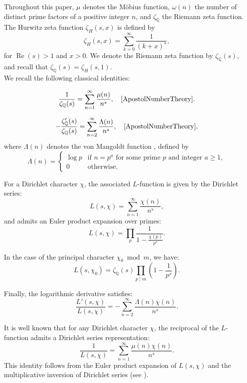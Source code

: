 \documentclass[12pt]{amsart}
\begin{document}
 
 
Throughout this paper, $\mu$ denotes the M\"obius function, $\omega(n)$ the number of distinct prime factors of a positive integer $n$, and $\zeta_\mathbb{Q}$ the Riemann zeta function.  The Hurwitz zeta function $\zeta_H(s,x)$ is defined by
\[
\zeta_H(s,x) = \sum_{k=0}^\infty \frac{1}{(k + x)^s},
\]
for $\operatorname{Re}(s) > 1$ and $x > 0$. We denote the Riemann zeta function by $\zeta_\mathbb{Q}(s)$, and recall that $\zeta_\mathbb{Q}(s) = \zeta_H(s,1)$.\\
 
 
 
 We recall the following classical identities:


\[
\frac{1}{\zeta_\mathbb{Q}(s)} = \sum_{n=1}^\infty \frac{\mu(n)}{n^s},
\quad \text{\cite[p.~229]{ApostolNumberTheory}}.
\]


\[
-\frac{\zeta_\mathbb{Q}'(s)}{\zeta_\mathbb{Q}(s)} = \sum_{n=2}^\infty \frac{\Lambda(n)}{n^s},
\quad \text{\cite[p.~236]{ApostolNumberTheory}},
\]
where $\Lambda(n)$ denotes the von Mangoldt function \cite[p.~32]{ApostolNumberTheory}, defined by
\[
\Lambda(n) =
\begin{cases}
\log p & \text{if } n = p^a \text{ for some prime } p \text{ and integer } a \geq 1, \\
0 & \text{otherwise}.
\end{cases}
\]


For a Dirichlet character $\chi$, the associated $L$-function is given by the Dirichlet series:
\[
L(s,\chi) = \sum_{n=1}^\infty \frac{\chi(n)}{n^s},
\]
and admits an Euler product expansion over primes:
\[
L(s,\chi) = \prod_{p} \frac{1}{1 - \frac{\chi(p)}{p^s}}.
\]


In the case of the principal character $\chi_0 \bmod m$, we have:
\[
L(s,\chi_0) = \zeta_\mathbb{Q}(s) \prod_{p \mid m} \left(1 - \frac{1}{p^s}\right).
\]

Finally, the logarithmic derivative satisfies:
\[
\frac{L'(s,\chi)}{L(s,\chi)} = -\sum_{n=2}^\infty \frac{\Lambda(n) \chi(n)}{n^s}.
\]


It is well known that for any Dirichlet character $\chi$, the reciprocal of the $L$-function admits a Dirichlet series representation:
\[
\frac{1}{L(s, \chi)} = \sum_{n=1}^\infty \frac{\mu(n) \chi(n)}{n^s}.
\]
This identity follows from the Euler product expansion of $L(s,\chi)$ and the multiplicative inversion of Dirichlet series (see  \cite[p.~229]{ApostolNumberTheory}).\\
\end{document}
